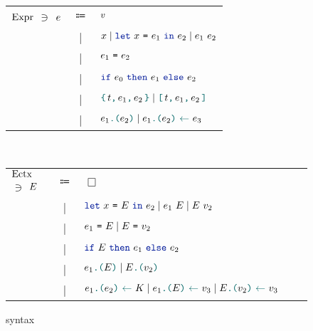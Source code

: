 \begin{figure}[tp]
  \begin{tabular}{rcl}
            $\datalangExpr[]$
            $\ni$
            $\datalangExpr$
            & $\Coloneqq$ &
            $\datalangVal$
        \\
            & | &
            $\datalangVar \mid \datalangLet{\datalangVar}{\datalangExpr_1}{\datalangExpr_2} \mid \datalangCall{\datalangExpr_1}{\datalangExpr_2}$
        \\
            & | &
            $\datalangEq{\datalangExpr_1}{\datalangExpr_2}$
        \\
            & | &
            $\datalangIf{\datalangExpr_0}{\datalangExpr_1}{\datalangExpr_2}$
        \\
            & | &
            $\datalangBlock{\datalangTag}{\datalangExpr_1}{\datalangExpr_2} \mid \datalangBlockDet{\datalangTag}{\datalangExpr_1}{\datalangExpr_2}$
        \\
            & | &
            $\datalangLoad{\datalangExpr_1}{\datalangExpr_2} \mid \datalangStore{\datalangExpr_1}{\datalangExpr_2}{\datalangExpr_3}$
  \end{tabular}~
  \begin{tabular}{lclcl}
            $\datalangEctx[]$
            $\ni$
            $\datalangEctx$
            & $\Coloneqq$ &
            $\Box$
        \\
            & | &
            $\datalangLet{\datalangVar}{\datalangEctx}{\datalangExpr_2} \mid \datalangCall{\datalangExpr_1}{\datalangEctx} \mid \datalangCall{\datalangEctx}{\datalangVal_2}$
        \\
            & | &
            $\datalangEq{\datalangExpr_1}{\datalangEctx} \mid \datalangEq{\datalangEctx}{\datalangVal_2}$
        \\
            & | &
            $\datalangIf{\datalangEctx}{\datalangExpr_1}{\datalangExpr_2}$
        \\
            & | &
            $\datalangLoad{\datalangExpr_1}{\datalangEctx} \mid \datalangLoad{\datalangEctx}{\datalangVal_2}$
        \\
            & | &
            $\datalangStore{\datalangExpr_1}{\datalangExpr_2}{K} \mid \datalangStore{\datalangExpr_1}{\datalangEctx}{\datalangVal_3} \mid \datalangStore{\datalangEctx}{\datalangVal_2}{\datalangVal_3}$
  \end{tabular}
    \caption{\DataLang syntax}
    \label{fig:syntax}
\end{figure}

